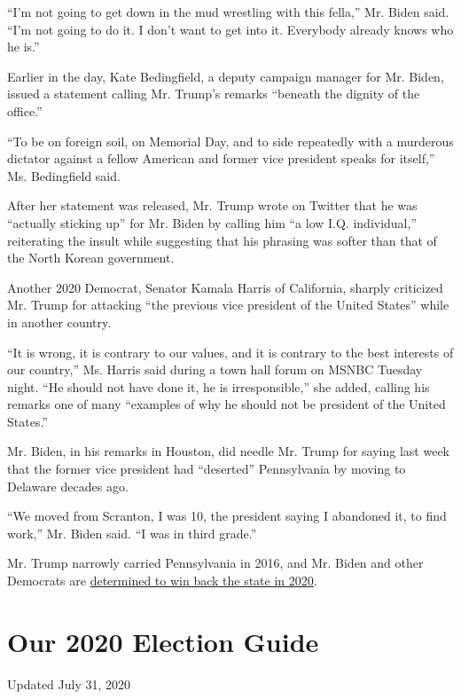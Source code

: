 ``I'm not going to get down in the mud wrestling with this fella,'' Mr.
Biden said. ``I'm not going to do it. I don't want to get into it.
Everybody already knows who he is.''

Earlier in the day, Kate Bedingfield, a deputy campaign manager for Mr.
Biden, issued a statement calling Mr. Trump's remarks ``beneath the
dignity of the office.''

``To be on foreign soil, on Memorial Day, and to side repeatedly with a
murderous dictator against a fellow American and former vice president
speaks for itself,'' Ms. Bedingfield said.

After her statement was released, Mr. Trump wrote on Twitter that he was
``actually sticking up'' for Mr. Biden by calling him ``a low I.Q.
individual,'' reiterating the insult while suggesting that his phrasing
was softer than that of the North Korean government.

Another 2020 Democrat, Senator Kamala Harris of California, sharply
criticized Mr. Trump for attacking ``the previous vice president of the
United States'' while in another country.

``It is wrong, it is contrary to our values, and it is contrary to the
best interests of our country,'' Ms. Harris said during a town hall
forum on MSNBC Tuesday night. ``He should not have done it, he is
irresponsible,'' she added, calling his remarks one of many ``examples
of why he should not be president of the United States.''

Mr. Biden, in his remarks in Houston, did needle Mr. Trump for saying
last week that the former vice president had ``deserted'' Pennsylvania
by moving to Delaware decades ago.

``We moved from Scranton, I was 10, the president saying I abandoned it,
to find work,'' Mr. Biden said. ``I was in third grade.''

Mr. Trump narrowly carried Pennsylvania in 2016, and Mr. Biden and other
Democrats are
\href{https://www.nytimes.com/2019/04/28/us/politics/biden-pennsylvania-2020.html}{determined
to win back the state in 2020}.

\hypertarget{our-2020-election-guide}{%
\section{Our 2020 Election Guide}\label{our-2020-election-guide}}

Updated July 31, 2020

